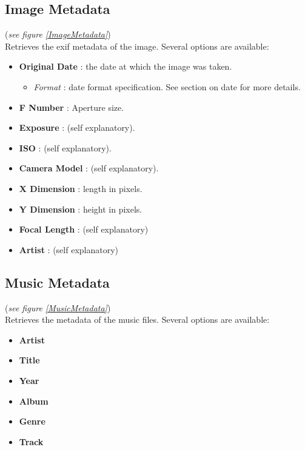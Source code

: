 \documentclass[11pt, a4paper]{scrartcl}
\begin{document}
\subsection*{Image Metadata}
(\emph{see figure \ref{ImageMetadata}})\\

Retrieves the exif metadata of the image. Several options are available:
\begin{itemize}
        \item \textbf{Original Date} : the date at which the image was taken.
                \begin{itemize}
                        \item \emph{Format} : date format specification. See section on date for more details. 
                \end{itemize}
        \item \textbf{F Number} : Aperture size.
        \item \textbf{Exposure} : (self explanatory).
        \item \textbf{ISO} : (self explanatory).
        \item \textbf{Camera Model} : (self explanatory).
        \item \textbf{X Dimension} : length in pixels.
        \item \textbf{Y Dimension} : height in pixels.
        \item \textbf{Focal Length} : (self explanatory)
        \item \textbf{Artist} : (self explanatory)
\end{itemize}

\subsection*{Music Metadata}
(\emph{see figure \ref{MusicMetadata}})\\

Retrieves the metadata of the music files. Several options are available:
\begin{itemize}
        \item \textbf{Artist}
        \item \textbf{Title} 
        \item \textbf{Year}
        \item \textbf{Album} 
        \item \textbf{Genre} 
        \item \textbf{Track} 
\end{itemize}
\end{document}
